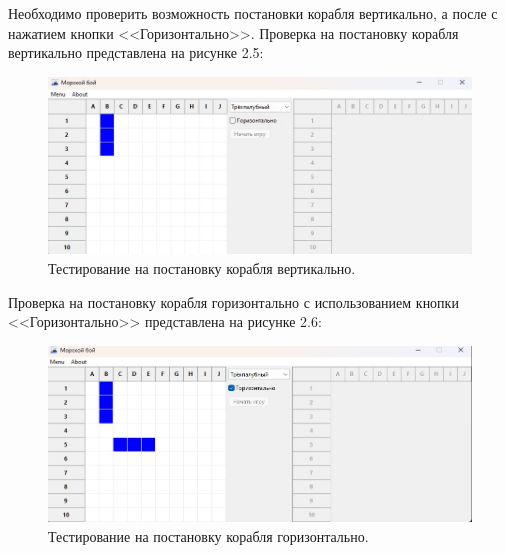 Необходимо проверить возможность постановки корабля вертикально, а после с нажатием кнопки <<Горизонтально>>. Проверка на постановку корабля вертикально представлена на рисунке 2.5:
\begin{figure}[H]
\graphicspath{ {img/} }
\centering
\includegraphics[width = 15cm]{Вертикально.jpg}
\caption{Тестирование на постановку корабля вертикально.}
\end{figure}
Проверка на постановку корабля горизонтально с использованием кнопки <<Горизонтально>> представлена на рисунке 2.6:
\begin{figure}[H]
\graphicspath{ {img/} }
\centering
\includegraphics[width = 15cm]{горизонтально.jpg}
\caption{Тестирование на постановку корабля горизонтально.}
\end{figure}
